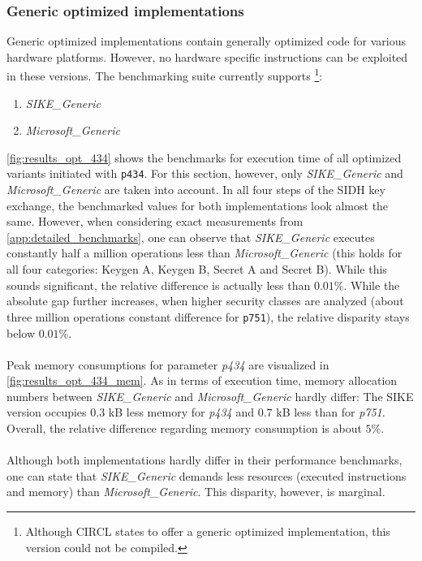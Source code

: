 \subsubsection{Generic optimized implementations}\label{sec:analysis_generic}
Generic optimized implementations contain generally optimized code for various hardware platforms. However, no hardware specific instructions can be exploited in these versions. The benchmarking suite currently supports \footnote{Although \gls{CIRCL} states to offer a generic optimized implementation\parencite{circl2020github}, this version could not be compiled.}:
\begin{enumerate}
\item \textit{SIKE\_Generic}
\item \textit{Microsoft\_Generic}
\end{enumerate}
\autoref{fig:results_opt_434} shows the benchmarks for execution time of all optimized variants initiated with \texttt{p434}. For this section, however, only \textit{SIKE\_Generic} and \textit{Microsoft\_Generic} are taken into account. In all four steps of the \gls{SIDH} key exchange, the benchmarked values for both implementations look almost the same. However, when considering exact measurements from  \ref{app:detailed_benchmarks}, one can observe that \textit{SIKE\_Generic} executes constantly half a million operations less than \textit{Microsoft\_Generic} (this holds for all four categories: Keygen A, Keygen B, Secret A and Secret B). While this sounds significant, the relative difference is actually less than $0.01$\%. While the absolute gap further increases, when higher security classes are analyzed (about three million operations constant difference for \texttt{p751}), the relative disparity stays below $0.01$\%.
\\\\
Peak memory consumptions for parameter \textit{p434} are visualized in  \autoref{fig:results_opt_434_mem}. As in terms of execution time, memory allocation numbers between \textit{SIKE\_Generic} and \textit{Microsoft\_Generic} hardly differ: The \gls{SIKE} version occupies $0.3$ \gls{kB} less memory for \textit{p434} and $0.7$ \gls{kB} less than for \textit{p751}. Overall, the relative difference regarding memory consumption is about $5$\%.
\\\\
Although both implementations hardly differ in their performance benchmarks, one can state that \textit{SIKE\_Generic} demands less resources (executed instructions and memory) than \textit{Microsoft\_Generic}. This disparity, however, is marginal.


